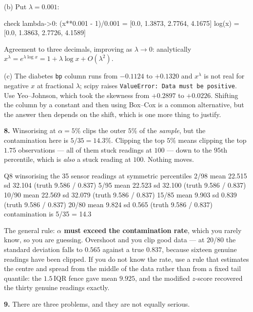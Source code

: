 \documentclass[11pt]{article}
\begin{document}
(b) Put $\lambda = 0.001$:

\begin{codeout}
    check lambda->0:  (x**0.001 - 1)/0.001 = [0.0, 1.3873, 2.7764, 4.1675]
    log(x)                                = [0.0, 1.3863, 2.7726, 4.1589]
\end{codeout}

Agreement to three decimals, improving as $\lambda \to 0$: analytically
$x^\lambda = e^{\lambda \log x} = 1 + \lambda\log x + O(\lambda^2)$.

(c) The diabetes \texttt{bp} column runs from $-0.1124$ to $+0.1320$ and
$x^{\lambda}$ is not real for negative $x$ at fractional $\lambda$; scipy
raises \texttt{ValueError: Data must be positive}. Use Yeo--Johnson, which took
the skewness from $+0.2897$ to $+0.0226$. Shifting the column by a constant and
then using Box--Cox is a common alternative, but the answer then depends on the
shift, which is one more thing to justify.

\medskip
\textbf{8.} Winsorising at $\alpha = 5\%$ clips the outer $5\%$ of the
\emph{sample}, but the contamination here is $5/35 = 14.3\%$. Clipping the top
$5\%$ means clipping the top $1.75$ observations --- all of them stuck readings
at $100$ --- down to the $95$th percentile, which is \emph{also} a stuck
reading at $100$. Nothing moves.

\begin{codeout}
Q8  winsorising the 35 sensor readings at symmetric percentiles
     2/98  mean  22.515  sd  32.104   (truth 9.586 / 0.837)
     5/95  mean  22.523  sd  32.100   (truth 9.586 / 0.837)
    10/90  mean  22.569  sd  32.079   (truth 9.586 / 0.837)
    15/85  mean   9.903  sd   0.839   (truth 9.586 / 0.837)
    20/80  mean   9.824  sd   0.565   (truth 9.586 / 0.837)
    contamination is 5/35 = 14.3%
\end{codeout}

The general rule: \textbf{$\alpha$ must exceed the contamination rate}, which
you rarely know, so you are guessing. Overshoot and you clip good data --- at
$20$/$80$ the standard deviation falls to $0.565$ against a true $0.837$,
because sixteen genuine readings have been clipped. If you do not know the
rate, use a rule that estimates the centre and spread from the middle of the
data rather than from a fixed tail quantile: the $1.5\,\mathrm{IQR}$ fence gave
mean $9.925$, and the modified $z$-score recovered the thirty genuine readings
exactly.

\medskip
\textbf{9.} There are three problems, and they are not equally serious.
\end{document}
